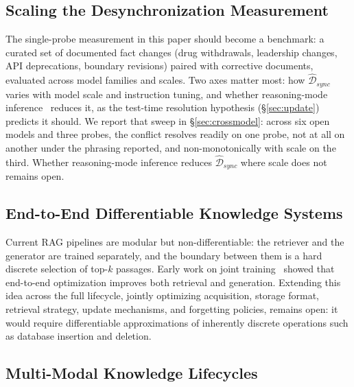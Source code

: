 \documentclass[manuscript, screen, review]{jair}
\begin{document}
\subsection{Scaling the Desynchronization Measurement}

The single-probe measurement in this paper should become a benchmark: a curated set of documented fact changes (drug withdrawals, leadership changes, API deprecations, boundary revisions) paired with corrective documents, evaluated across model families and scales. Two axes matter most: how $\widehat{\mathcal{D}}_{sync}$ varies with model scale and instruction tuning, and whether reasoning-mode inference~\citep{openai2024o1, guo2025deepseekr1} reduces it, as the test-time resolution hypothesis (\S\ref{sec:update}) predicts it should. We report that sweep in \S\ref{sec:crossmodel}: across six open models and three probes, the conflict resolves readily on one probe, not at all on another under the phrasing reported, and non-monotonically with scale on the third. Whether reasoning-mode inference reduces $\widehat{\mathcal{D}}_{sync}$ where scale does not remains open.

\subsection{End-to-End Differentiable Knowledge Systems}

Current RAG pipelines are modular but non-differentiable: the retriever and the generator are trained separately, and the boundary between them is a hard discrete selection of top-$k$ passages. Early work on joint training~\citep{guu2020realm, izacard2023atlas} showed that end-to-end optimization improves both retrieval and generation. Extending this idea across the full lifecycle, jointly optimizing acquisition, storage format, retrieval strategy, update mechanisms, and forgetting policies, remains open: it would require differentiable approximations of inherently discrete operations such as database insertion and deletion.

\subsection{Multi-Modal Knowledge Lifecycles}
\end{document}
